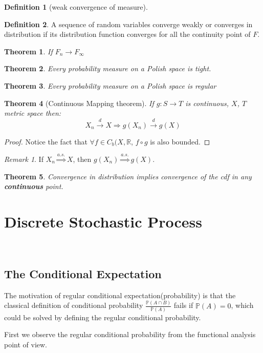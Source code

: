 \documentclass[a4paper,11pt]{book}
\newtheorem{theorem}{Theorem}[section]
\theoremstyle{definition}
\newtheorem{definition}{Definition}[section]
\theoremstyle{remark}
\newtheorem*{remark}{Remark}
\begin{document}
\begin{definition}[weak convergence of measure]
	
\end{definition}


\begin{definition}
	A sequence of random variables converge weakly or converges in distribution if its distribution function converges for all the continuity point of $F$.
\end{definition}

\begin{theorem}
	If $F_n \rightarrow F_\infty$
\end{theorem}

\begin{theorem}
	Every probability measure on a Polish space is tight.
\end{theorem}

\begin{theorem}
	Every probability measure on a Polish space is regular
\end{theorem}

\begin{theorem}[Continuous Mapping theorem]
	If $g: S \rightarrow T$ is continuous, $X$, $T$ metric space then:
	\begin{equation*}
		X_n \overset{d}{\rightarrow} X \Rightarrow g(X_n) \overset{d}{\rightarrow} g(X)
	\end{equation*}
\end{theorem}
\begin{proof}
	Notice the fact that $\forall f \in C_b(X, \mathbb{R}$, $f\circ g$ is also bounded.
\end{proof}
\begin{remark}
If $X_n \overset{a.s.}{\Rightarrow} X$, then $g(X_n) \overset{a.s.}{\Rightarrow} g(X)$.	
\end{remark}

\begin{theorem}
	Convergence in distribution implies convergence of the cdf in any \textbf{continuous} point.
\end{theorem}


\chapter{Discrete Stochastic Process}
\

\newpage
\section{The Conditional Expectation}
The motivation of regular conditional expectation(probability) is that the classical definition of conditional probability $\frac{\mathbb{P}(A \cap B)}{\mathbb{P}(A)}$ fails if $\mathbb{P}(A) = 0$, which could be solved by defining the regular conditional probability.\par 
 First we observe the regular conditional probability from the functional analysis point of view. 
\end{document}
